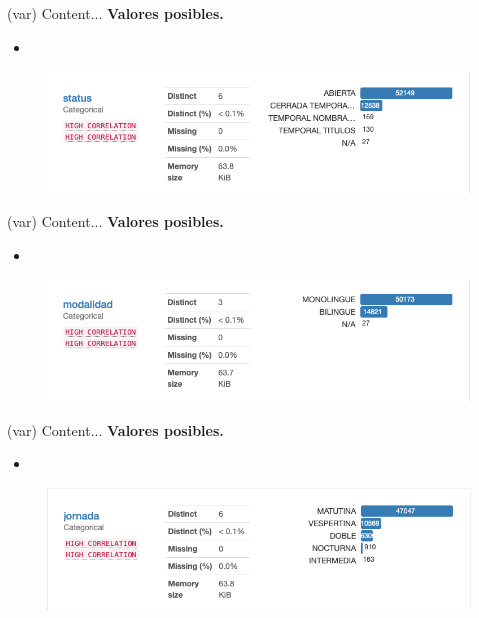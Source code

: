 
\begin{variable}(var) 
Content... 
\bigbreak 
\textbf{Valores posibles.}
\begin{itemize}
	\item 
\end{itemize}
\begin{figure}[H]
	\centering
	\includegraphics[scale=0.5]{Images/11}
\end{figure}
\end{variable}


\begin{variable}(var) 
Content... 
\bigbreak 
\textbf{Valores posibles.}
\begin{itemize}
	\item 
\end{itemize}
\begin{figure}[H]
	\centering
	\includegraphics[scale=0.5]{Images/12}
\end{figure}
\end{variable}


\begin{variable}(var) 
Content... 
\bigbreak 
\textbf{Valores posibles.}
\begin{itemize}
	\item 
\end{itemize}
\begin{figure}[H]
	\centering
	\includegraphics[scale=0.5]{Images/13}
\end{figure}
\end{variable}

